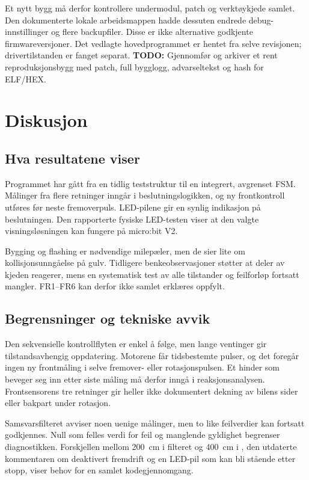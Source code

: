\documentclass[a4paper,11pt,oneside]{report}
\newcommand{\todo}[1]{\textcolor{todocolor}{\textbf{TODO:} #1}}
\newcommand{\kode}[1]{\begingroup
 \sbox0{\texttt{\detokenize{#1}}}%
 \ifdim\wd0>150pt\relax
  {\urlstyle{tt}\expandafter\nolinkurl\expandafter{\detokenize{#1}}}%
 \else\usebox0\fi\endgroup}
\begin{document}
Et nytt bygg må derfor kontrollere undermodul, patch og verktøykjede samlet.
Den dokumenterte lokale arbeidsmappen hadde dessuten endrede
debug-innstillinger og flere backupfiler. Disse er ikke alternative
godkjente firmwareversjoner. Det vedlagte hovedprogrammet er hentet fra
selve revisjonen; drivertilstanden er fanget separat.
\todo{Gjennomfør og arkiver et rent reproduksjonsbygg med patch,
full bygglogg, advarseltekst og hash for ELF/HEX.}

\chapter{Diskusjon}\label{ch:diskusjon}
\section{Hva resultatene viser}
Programmet har gått fra en tidlig teststruktur til en integrert, avgrenset
FSM. Målinger fra flere retninger inngår i beslutningslogikken, og ny
frontkontroll utføres før neste fremoverpuls. LED-pilene gir en synlig
indikasjon på beslutningen. Den rapporterte fysiske LED-testen viser at
den valgte visningsløsningen kan fungere på micro:bit V2.

Bygging og flashing er nødvendige milepæler, men de sier lite om
kollisjonsunngåelse på gulv. Tidligere benkeobservasjoner støtter at
deler av kjeden reagerer, mens en systematisk test av alle tilstander og
feilforløp fortsatt mangler. FR1--FR6 kan derfor ikke samlet erklæres oppfylt.

\section{Begrensninger og tekniske avvik}
Den sekvensielle kontrollflyten er enkel å følge, men lange ventinger gir
tilstandsavhengig oppdatering. Motorene får tidsbestemte pulser, og det
foregår ingen ny frontmåling i selve fremover- eller rotasjonspulsen.
Et hinder som beveger seg inn etter siste måling må derfor inngå i
reaksjonsanalysen. Frontsensorens tre retninger gir heller ikke dokumentert
dekning av bilens sider eller bakpart under rotasjon.

Samsvarsfilteret avviser noen uenige målinger, men to like feilverdier kan
fortsatt godkjennes. Null som felles verdi for feil og manglende gyldighet
begrenser diagnostikken. Forskjellen mellom 200~cm i filteret og 400~cm i
\kode{Verify}, den utdaterte kommentaren om deaktivert fremdrift og en LED-pil
som kan bli stående etter stopp, viser behov for en samlet kodegjennomgang.
\end{document}
